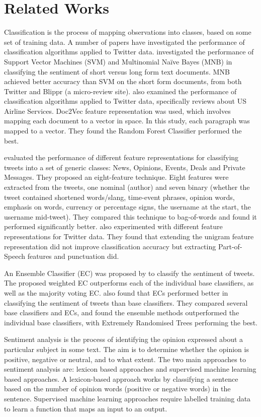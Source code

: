 \section{Related Works}

Classification is the process of mapping observations into classes, based on some set of training data. A number of papers have investigated the performance of classification algorithms applied to Twitter data. \cite{Berm2010} investigated the performance of Support Vector Machines (SVM) and Multinomial Naïve Bayes (MNB) in classifying the sentiment of short versus long form text documents. MNB achieved better accuracy than SVM on the short form documents, from both Twitter and Blippr (a micro-review site). \cite{Rane2018} also examined the performance of classification algorithms applied to Twitter data, specifically reviews about US Airline Services. Doc2Vec feature representation was used, which involves mapping each document to a vector in space. In this study, each paragraph was mapped to a vector. They found the Random Forest Classifier performed the best.

\cite{sriram2010} evaluated the performance of different feature representations for classifying tweets into a set of generic classes: News, Opinions, Events, Deals and Private Messages. They proposed an eight-feature technique. Eight features were extracted from the tweets, one nominal (author) and seven binary (whether the tweet contained shortened words/slang, time-event phrases, opinion words, emphasis on words, currency or percentage signs, the username at the start, the username mid-tweet). They compared this technique to bag-of-words and found it performed significantly better. \cite{Berm2010} also experimented with different feature representations for Twitter data. They found that extending the unigram feature representation did not improve classification accuracy but extracting Part-of-Speech features and punctuation did. 

An Ensemble Classifier (EC) was proposed by \cite{Ankit2018} to classify the sentiment of tweets. The proposed weighted EC outperforms each of the individual base classifiers, as well as the majority voting EC. \cite{Kanakaraj2015} also found that ECs performed better in classifying the sentiment of tweets than base classifiers. They compared several base classifiers and ECs, and found the ensemble methods outperformed the individual base classifiers, with Extremely Randomised Trees performing the best.

Sentiment analysis is the process of identifying the opinion expressed about a particular subject in some text. The aim is to determine whether the opinion is positive, negative or neutral, and to what extent. The two main approaches to sentiment analysis are: lexicon based approaches and supervised machine learning based approaches. A lexicon-based approach works by classifying a sentence based on the number of opinion words (positive or negative words) in the sentence. Supervised machine learning approaches require labelled training data to learn a function that maps an input to an output.

